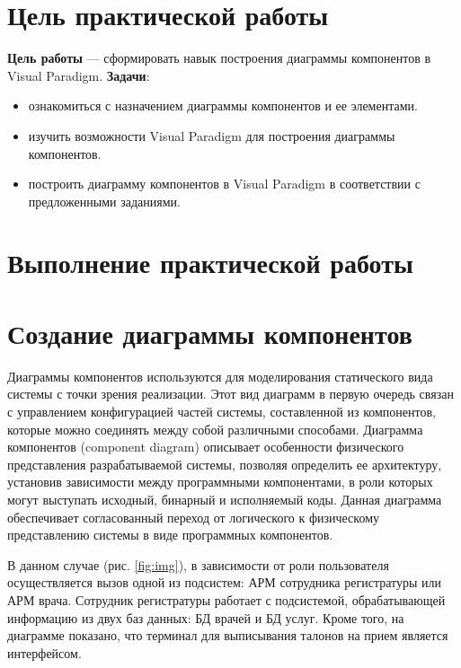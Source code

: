 \graphicspath{{./img}} %

\section*{\LARGE Цель практической работы}

\textbf{Цель работы} --- сформировать навык построения диаграммы компонентов
в Visual Paradigm.
\textbf{Задачи}:
\begin{itemize}
	\item ознакомиться с назначением диаграммы компонентов и ее элементами.
	\item изучить возможности Visual Paradigm для построения диаграммы
		компонентов.
	\item построить диаграмму компонентов в Visual Paradigm в соответствии с
		предложенными заданиями.
\end{itemize}


\clearpage

\section*{\LARGE Выполнение практической работы}
\section{Создание диаграммы компонентов}
Диаграммы компонентов используются для моделирования статического
вида системы с точки зрения реализации. Этот вид диаграмм в первую очередь
связан с управлением конфигурацией частей системы, составленной из
компонентов, которые можно соединять между собой различными способами.
Диаграмма компонентов (component diagram) описывает особенности
физического представления разрабатываемой системы, позволяя определить ее
архитектуру, установив зависимости между программными компонентами, в
роли которых могут выступать исходный, бинарный и исполняемый коды.
Данная диаграмма обеспечивает согласованный переход от логического к
физическому представлению системы в виде программных компонентов.\par
В данном случае (рис. \ref{fig:img}), в зависимости от роли
пользователя осуществляется вызов одной из подсистем: АРМ сотрудника
регистратуры или АРМ врача. Сотрудник регистратуры работает с подсистемой,
обрабатывающей информацию из двух баз данных: БД врачей и БД услуг.
Кроме того, на диаграмме показано, что терминал для выписывания талонов
на прием является интерфейсом.

